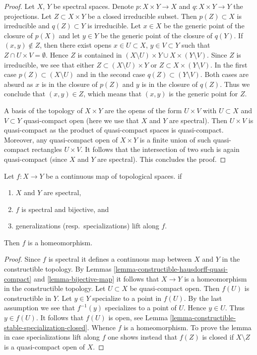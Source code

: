 \begin{proof}
Let $X$, $Y$ be spectral spaces. Denote $p : X \times Y \to X$ and
$q : X \times Y \to Y$ the projections. Let $Z \subset X \times Y$ be a
closed irreducible subset. Then $p(Z) \subset X$ is irreducible
and $q(Z) \subset Y$ is irreducible. Let $x \in X$ be the generic
point of the closure of $p(X)$ and let $y \in Y$ be the generic
point of the closure of $q(Y)$. If $(x, y) \not \in Z$, then
there exist opens $x \in U \subset X$, $y \in V \subset Y$ such
that $Z \cap U \times V = \emptyset$. Hence $Z$ is contained
in $(X \setminus U) \times Y \cup X \times (Y \setminus V)$.
Since $Z$ is irreducible, we see that either
$Z \subset (X \setminus U) \times Y$ or $Z \subset X \times (Y \setminus V)$.
In the first case $p(Z) \subset (X \setminus U)$ and in the
second case $q(Z) \subset (Y \setminus V)$. Both cases are absurd
as $x$ is in the closure of $p(Z)$ and $y$ is in the closure of
$q(Z)$. Thus we conclude that $(x, y) \in Z$, which means that
$(x, y)$ is the generic point for $Z$.

\medskip\noindent
A basis of the topology of $X \times Y$ are the opens of the form
$U \times V$ with $U \subset X$ and $V \subset Y$ quasi-compact open
(here we use that $X$ and $Y$ are spectral). Then $U \times V$ is
quasi-compact as the product of quasi-compact spaces is quasi-compact.
Moreover, any quasi-compact open of $X \times Y$ is a finite union
of such quasi-compact rectangles $U \times V$. It follows that
the intersection of two such is again quasi-compact
(since $X$ and $Y$ are spectral). This concludes the proof.
\end{proof}

\begin{lemma}
\label{lemma-spectral-bijective}
Let $f : X \to Y$ be a continuous map of topological spaces. if
\begin{enumerate}
\item $X$ and $Y$ are spectral,
\item $f$ is spectral and bijective, and
\item generalizations (resp.\ specializations) lift along $f$.
\end{enumerate}
Then $f$ is a homeomorphism.
\end{lemma}

\begin{proof}
Since $f$ is spectral it defines a continuous map between $X$ and $Y$ in
the constructible topology. By
Lemmas \ref{lemma-constructible-hausdorff-quasi-compact} and
\ref{lemma-bijective-map}
it follows that $X \to Y$ is a homeomorphism in the constructible
topology. Let $U \subset X$ be quasi-compact open.
Then $f(U)$ is constructible in $Y$. Let $y \in Y$ specialize
to a point in $f(U)$. By the last assumption we see that $f^{-1}(y)$
specializes to a point of $U$. Hence $y \in U$. Thus $y \in f(U)$.
It follows that $f(U)$ is open, see
Lemma \ref{lemma-constructible-stable-specialization-closed}.
Whence $f$ is a homeomorphism.
To prove the lemma in case specializations lift along $f$
one shows instead that $f(Z)$ is closed if $X \setminus Z$ is a
quasi-compact open of $X$.
\end{proof}

